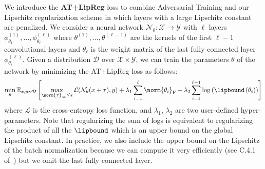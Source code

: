 We introduce the \textbf{AT+LipReg} loss to combine Adversarial Training and our Lipschitz regularization scheme in which layers with a large Lipschitz constant are penalized.
We consider a neural network $\mathcal N_\theta : \mathcal X \rightarrow \mathcal Y$ with $\ell$ layers $\phi^{(1)}_{\theta_1}, \ldots, \phi^{(\ell)}_{\theta_\ell}$ where $\theta^{(1)}, \ldots, \theta^{(\ell -1)}$ are the kernels of the first $\ell - 1$ convolutional layers and $\theta_\ell$ is the weight matrix of the last fully-connected  layer $\phi^{(\ell)}_{\theta_\ell}$.
Given a distribution $\mathcal D$ over $\mathcal X \times \mathcal Y$, we can train the parameters $\theta$ of the network by minimizing the AT+LipReg loss as follows:
\begin{equation} \label{equation:objectif_function}
    \min_{\theta} \mathbb E_{x,y \sim \mathcal D} \left[ \max_{\norm{\tau}_\infty \leq \epsilon} \mathcal{L}(\mathcal{N}_\theta(x + \tau), y)  + \lambda_1 \sum_{i=1}^\ell {\textstyle \norm{\theta_i}_\text{F}} + \lambda_2 \sum_{i=1}^{\ell-1} \log\left( \lipbound\left(\theta_i\right)\right) \right]
\end{equation}
where $\mathcal L$ is the cross-entropy loss function, and $\lambda_1$, $\lambda_2$ are two user-defined hyper-parameters.
Note that regularizing the sum of logs is equivalent to regularizing the product of all the $\lipbound$ which is an upper bound on the global Lipschitz constant.
In practice, we also include the upper bound on the Lipschitz of the batch normalization because we can compute it very efficiently (see C.4.1 of~\citet{tsuzuku2018lipschitz}) but we omit the last fully connected layer. 

